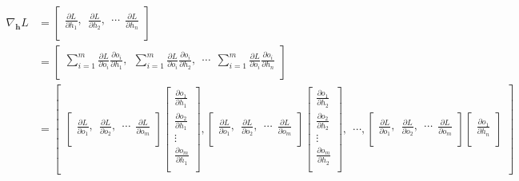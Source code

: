 \documentclass[12pt]{article}
\numberwithin{equation}{section}
\begin{document}
\begin{align*}
\nabla_{\mathbf{h}} L &= 
\begin{bmatrix}
\frac{\partial L}{\partial h_1},
\ \ \frac{\partial L}{\partial h_2},
\ \ \cdots
\ \ \frac{\partial L}{\partial h_n}\\
\end{bmatrix} \\&= 
\begin{bmatrix}
\sum_{i=1}^{m} \frac{\partial L}{\partial o_i}\frac{\partial o_i}{\partial h_1},
\ \ \sum_{i=1}^{m}  \frac{\partial L}{\partial o_i}\frac{\partial o_i}{\partial h_2},
\ \ \cdots
\ \ \sum_{i=1}^{m}  \frac{\partial L}{\partial o_i}\frac{\partial o_i}{\partial h_n}\\
\end{bmatrix} \\&=
\begin{bmatrix}
	\begin{bmatrix}
	\frac{\partial L}{\partial o_1},
	\ \ \frac{\partial L}{\partial o_2},
	\ \ \cdots
	\ \ \frac{\partial L}{\partial o_m}\\
	\end{bmatrix}
	\begin{bmatrix}
	\frac{\partial o_1}{\partial h_1}\\
	\frac{\partial o_2}{\partial h_1}\\
	\vdots\\
	\frac{\partial o_m}{\partial h_1}\\
	\end{bmatrix},
	\begin{bmatrix}
	\frac{\partial L}{\partial o_1},
	\ \ \frac{\partial L}{\partial o_2},
	\ \ \cdots
	\ \ \frac{\partial L}{\partial o_m}\\
	\end{bmatrix}
	\begin{bmatrix}
	\frac{\partial o_1}{\partial h_2}\\
	\frac{\partial o_2}{\partial h_2}\\
	\vdots\\
	\frac{\partial o_m}{\partial h_2}\\
	\end{bmatrix},
\ \ \cdots,
	\begin{bmatrix}
	\frac{\partial L}{\partial o_1},
	\ \ \frac{\partial L}{\partial o_2},
	\ \ \cdots
	\ \ \frac{\partial L}{\partial o_m}\\
	\end{bmatrix}
	\begin{bmatrix}
	\frac{\partial o_1}{\partial h_n}\\

\end{bmatrix}
\end{bmatrix}
\end{align*}
\end{document}
